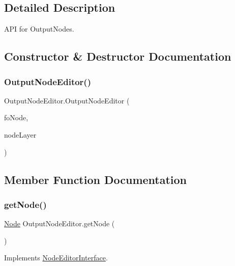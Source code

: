 \subsection{Detailed Description}
A\+PI for Output\+Nodes. 



\subsection{Constructor \& Destructor Documentation}
\mbox{\label{class_output_node_editor_a623838b68ab06f8409a371e119bf70ac}} 
\subsubsection{\texorpdfstring{Output\+Node\+Editor()}{OutputNodeEditor()}}
{\footnotesize\ttfamily Output\+Node\+Editor.\+Output\+Node\+Editor (\begin{DoxyParamCaption}\item[{\mbox{\hyperlink{class_output_node}{Output\+Node}}}]{fo\+Node,  }\item[{int}]{node\+Layer }\end{DoxyParamCaption})}



\subsection{Member Function Documentation}
\mbox{\label{class_output_node_editor_afca854ca2a34703a1becfee48da12631}} 
\subsubsection{\texorpdfstring{get\+Node()}{getNode()}}
{\footnotesize\ttfamily \mbox{\hyperlink{class_node}{Node}} Output\+Node\+Editor.\+get\+Node (\begin{DoxyParamCaption}{ }\end{DoxyParamCaption})}



Implements \mbox{\hyperlink{interface_node_editor_interface_a56e2abaedf17d7fbf2be90d521ec9363}{Node\+Editor\+Interface}}.

